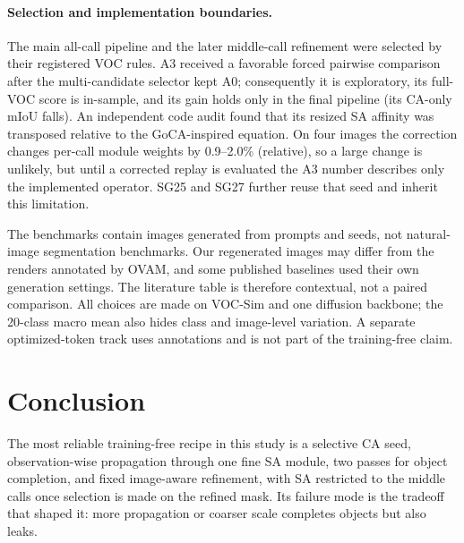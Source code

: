 \paragraph{Selection and implementation boundaries.}
The main all-call pipeline and the later middle-call refinement were selected by their registered VOC rules. A3 received a favorable forced pairwise comparison after the multi-candidate selector kept A0; consequently it is exploratory, its full-VOC score is in-sample, and its gain holds only in the final pipeline (its CA-only mIoU falls). An independent code audit found that its resized SA affinity was transposed relative to the GoCA-inspired equation. On four images the correction changes per-call module weights by 0.9--2.0\% (relative), so a large change is unlikely, but until a corrected replay is evaluated the A3 number describes only the implemented operator. SG25 and SG27 further reuse that seed and inherit this limitation.

The benchmarks contain images generated from prompts and seeds, not natural-image segmentation benchmarks. Our regenerated images may differ from the renders annotated by OVAM, and some published baselines used their own generation settings. The literature table is therefore contextual, not a paired comparison. All choices are made on VOC-Sim and one diffusion backbone; the 20-class macro mean also hides class and image-level variation. A separate optimized-token track uses annotations and is not part of the training-free claim.

\section{Conclusion}
The most reliable training-free recipe in this study is a selective CA seed, observation-wise propagation through one fine SA module, two passes for object completion, and fixed image-aware refinement, with SA restricted to the middle calls once selection is made on the refined mask. Its failure mode is the tradeoff that shaped it: more propagation or coarser scale completes objects but also leaks.
